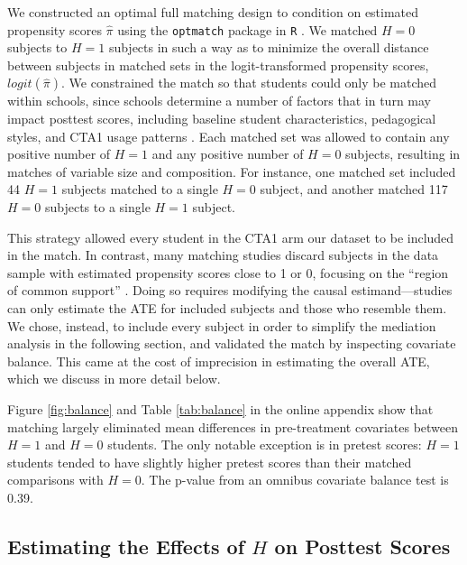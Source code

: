\documentclass{article}\usepackage[]{graphicx}\usepackage[]{color}
\begin{document}
We constructed an optimal full matching design \citep{hansen2004} to
condition on estimated propensity scores $\hat{\pi}$ using the
\texttt{optmatch} package in \texttt{R} \citep{optmatch}.
We matched $H=0$ subjects to $H=1$ subjects in such a way as
to minimize the overall distance between subjects in matched sets in
the logit-transformed propensity scores, $logit(\hat{\pi})$.
We constrained the match so that students could only be matched within
schools, since schools determine a number of factors
that in turn may impact posttest scores, including baseline
student characteristics, pedagogical styles, and CTA1 usage patterns
\citep[see][]{descriptivePaper}.%
Each matched set was allowed to contain any positive number of $H=1$
and any positive number of $H=0$ subjects, resulting in matches of
variable size and composition.
For instance, one matched set included 44 $H=1$ subjects matched to a
single $H=0$ subject, and another matched 117 $H=0$ subjects to a
single $H=1$ subject.

This strategy allowed every student in the CTA1 arm our dataset to be included in the match.
In contrast, many matching studies discard subjects in the data sample
with estimated propensity scores close to 1 or 0, focusing on the
``region of common support'' \citep[e.g.]{caliendo2008some,shadish2010primer}.
Doing so requires modifying the causal estimand---studies can only
estimate the ATE for included subjects and those who resemble them.
We chose, instead, to include every subject in order to simplify the mediation
analysis in the following section, and validated the match by
inspecting covariate balance.
This came at the cost of imprecision in estimating the overall ATE,
which we discuss in more detail below.

Figure \ref{fig:balance} and Table \ref{tab:balance} in the online appendix show that
matching largely eliminated mean differences in pre-treatment
covariates between $H=1$ and $H=0$ students.
The only notable exception is in pretest scores: $H=1$ students tended
to have slightly higher pretest scores than their matched comparisons
with $H=0$.
The p-value from an omnibus covariate balance test
\citep{covBal} is 0.39.

\subsection{Estimating the Effects of $H$ on Posttest Scores}
\end{document}
